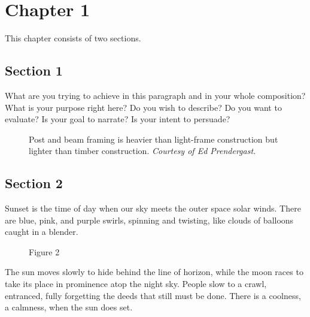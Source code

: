 \chapter{Chapter 1}
\label{chapter:1}


This chapter consists of two sections.

\section{Section 1}
\label{section:1}

What are you trying to achieve in this paragraph and in your whole composition? What is your purpose right here? Do you wish to describe? Do you want to evaluate? Is your goal to narrate? Is your intent to persuade?

\begin{figure}[]
\caption{Post and beam framing is heavier than light-frame construction but lighter than timber construction. \emph{Courtesy of Ed Prendergast.}}
\label{fig:1}
\end{figure}

\section{Section 2}
\label{section:2}

Sunset is the time of day when our sky meets the outer space solar winds. There are blue, pink, and purple swirls, spinning and twisting, like clouds of balloons caught in a blender. 

\begin{figure}[]
\caption{Figure 2}
\label{fig:2}
\end{figure}

The sun moves slowly to hide behind the line of horizon, while the moon races to take its place in prominence atop the night sky. People slow to a crawl, entranced, fully forgetting the deeds that still must be done. There is a coolness, a calmness, when the sun does set.
